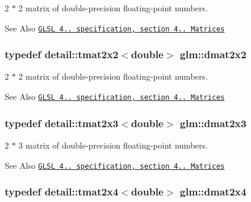 2 $\ast$ 2 matrix of double-\/precision floating-\/point numbers. 

\begin{DoxySeeAlso}{See Also}
\href{http://www.opengl.org/registry/doc/GLSLangSpec.4.20.8.pdf}{\tt G\-L\-S\-L 4.. specification, section 4.. Matrices} 
\end{DoxySeeAlso}
\hypertarget{group__core__types_ga2c1de969d1d8cfcb297dbfa476b33dc8}{
\subsubsection[{dmat2x2}]{\setlength{\rightskip}{0pt plus 5cm}typedef detail\-::tmat2x2$<$double$>$ {\bf glm\-::dmat2x2}}}\label{group__core__types_ga2c1de969d1d8cfcb297dbfa476b33dc8}


2 $\ast$ 2 matrix of double-\/precision floating-\/point numbers. 

\begin{DoxySeeAlso}{See Also}
\href{http://www.opengl.org/registry/doc/GLSLangSpec.4.20.8.pdf}{\tt G\-L\-S\-L 4.. specification, section 4.. Matrices} 
\end{DoxySeeAlso}
\hypertarget{group__core__types_gadba2f0efb492f511466de9784b0e07cd}{
\subsubsection[{dmat2x3}]{\setlength{\rightskip}{0pt plus 5cm}typedef detail\-::tmat2x3$<$double$>$ {\bf glm\-::dmat2x3}}}\label{group__core__types_gadba2f0efb492f511466de9784b0e07cd}


2 $\ast$ 3 matrix of double-\/precision floating-\/point numbers. 

\begin{DoxySeeAlso}{See Also}
\href{http://www.opengl.org/registry/doc/GLSLangSpec.4.20.8.pdf}{\tt G\-L\-S\-L 4.. specification, section 4.. Matrices} 
\end{DoxySeeAlso}
\hypertarget{group__core__types_gaa97c63383e2dc472510d77409a7d5001}{
\subsubsection[{dmat2x4}]{\setlength{\rightskip}{0pt plus 5cm}typedef detail\-::tmat2x4$<$double$>$ {\bf glm\-::dmat2x4}}}\label{group__core__types_gaa97c63383e2dc472510d77409a7d5001}



